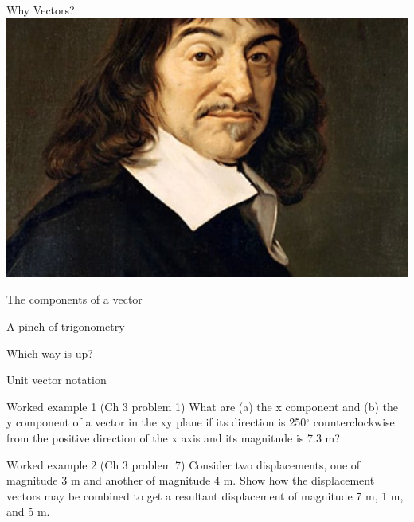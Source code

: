\begin{frame}{Why Vectors?}
\small
\includegraphics[scale=0.2]{descartes}

\end{frame}

\begin{frame}{The components of a vector}
\small

\end{frame}





\begin{frame}{A pinch of trigonometry}
\small

\end{frame}

\begin{frame}{Which way is up?}
\small

\end{frame}

\begin{frame}{Unit vector notation}
\small

\end{frame}

\begin{frame}{Worked example 1 (Ch 3 problem 1)}
\small
What are (a) the x component and (b) the y component of a vector in the xy plane if its direction is 250$^{\circ}$ counterclockwise from the positive direction of the x axis and its magnitude is 7.3 m?\\[25ex]

\end{frame}

\begin{frame}{Worked example 2 (Ch 3 problem 7)}
\small
 Consider two displacements, one of magnitude 3 m and another of magnitude 4 m. Show how the displacement vectors may be combined to get a resultant displacement of magnitude  7 m, 1 m, and 5 m.\\[25ex]

\end{frame}


